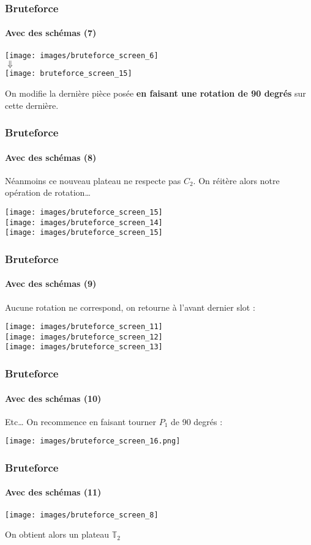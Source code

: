 \documentclass{beamer}
\begin{document}
\begin{frame}
	\frametitle{Bruteforce}
	\framesubtitle{Avec des schémas (7)}
	\begin{center}
		\texttt{[image: images/bruteforce\_screen\_6]} \\ $\Downarrow$  \\ \texttt{[image: bruteforce\_screen\_15]}
	\end{center}
	\footnotesize
	On modifie la dernière pièce posée \textbf{en faisant une rotation de 90 degrés} sur cette dernière.
	
\end{frame}

\begin{frame}
	\frametitle{Bruteforce}
	\framesubtitle{Avec des schémas (8)}
	Néanmoins ce nouveau plateau ne respecte pas $C_2$. On réitère alors notre opération de rotation…
	\begin{center}
		\texttt{[image: images/bruteforce\_screen\_15]} \\
		\texttt{[image: images/bruteforce\_screen\_14]} \\
		\texttt{[image: images/bruteforce\_screen\_15]}
		
	\end{center}
\end{frame}
\begin{frame}
	\frametitle{Bruteforce}
	\framesubtitle{Avec des schémas (9)}
	Aucune rotation ne correspond, on retourne à l'avant dernier slot :
	\begin{center}
		\texttt{[image: images/bruteforce\_screen\_11]} \\
		\texttt{[image: images/bruteforce\_screen\_12]} \\
		\texttt{[image: images/bruteforce\_screen\_13]}
		
	\end{center}

\end{frame}
\begin{frame}
	\frametitle{Bruteforce}
	\framesubtitle{Avec des schémas (10)}
	Etc… On recommence en faisant tourner $P_1$ de 90 degrés : 
	\begin{center}
		\texttt{[image: images/bruteforce\_screen\_16.png]}
	\end{center}

\end{frame}

\begin{frame}
	\frametitle{Bruteforce}
	\framesubtitle{Avec des schémas (11)}
	\begin{center}
		\texttt{[image: images/bruteforce\_screen\_8]}
	\end{center}
	On obtient alors un plateau $\mathbb{T}_2$
\end{frame}
\end{document}
